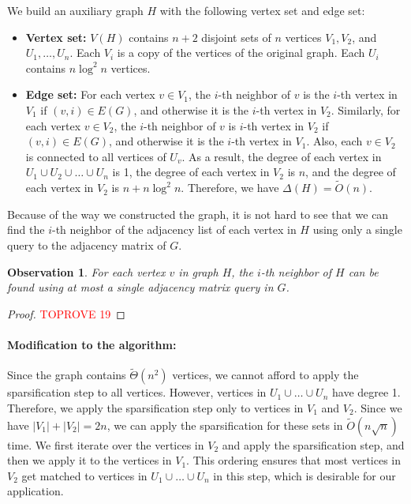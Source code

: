 \documentclass[letterpaper,11pt]{article}
\newcommand{\wt}[1]{\ensuremath{\widetilde{#1}}}
\newtheorem{observation}[lemma]{Observation}
\begin{document}
We build an auxiliary graph $H$ with the following vertex set and edge set:
\begin{itemize}
    \item \textbf{Vertex set:} $V(H)$ contains $n+2$ disjoint sets of $n$ vertices $V_1, V_2$, and $U_1, \ldots, U_n$. Each $V_i$ is a copy of the vertices of the original graph. Each $U_i$ contains $n \log^2 n$ vertices.
    \item \textbf{Edge set:} For each vertex $v \in V_1$, the $i$-th neighbor of $v$ is the $i$-th vertex in $V_1$ if $(v, i) \in E(G)$, and otherwise it is the $i$-th vertex in $V_2$. Similarly, for each vertex $v \in V_2$, the $i$-th neighbor of $v$ is $i$-th vertex in $V_2$ if $(v, i) \in E(G)$, and otherwise it is the $i$-th vertex in $V_1$. Also, each $v \in V_2$ is connected to all vertices of $U_v$. As a result, the degree of each vertex in $U_1 \cup U_2 \cup \ldots \cup U_n$ is 1, the degree of each vertex in $V_2$ is $n$, and the degree of each vertex in $V_2$ is $n + n\log^2 n$. Therefore, we have $\Delta(H) = \wt{O}(n)$.
\end{itemize}

Because of the way we constructed the graph, it is not hard to see that we can find the $i$-th neighbor of the adjacency list of each vertex in $H$ using only a single query to the adjacency matrix of $G$.


\begin{observation}
    For each vertex $v$ in graph $H$, the $i$-th neighbor of $H$ can be found using at most a single adjacency matrix query in $G$.
\end{observation}
\begin{proof}\textcolor{red}{TOPROVE 19}\end{proof}

\paragraph{Modification to the algorithm:} Since the graph contains $\wt{\Theta}(n^2)$ vertices, we cannot afford to apply the sparsification step to all vertices. However, vertices in $U_1 \cup \ldots \cup U_n$ have degree 1. Therefore, we apply the sparsification step only to vertices in $V_1$ and $V_2$. Since we have $|V_1| + |V_2| = 2n$, we can apply the sparsification for these sets in $\wt{O}(n\sqrt{n})$ time. We first iterate over the vertices in $V_2$ and apply the sparsification step, and then we apply it to the vertices in $V_1$. This ordering ensures that most vertices in $V_2$ get matched to vertices in $U_1 \cup \ldots \cup U_n$ in this step, which is desirable for our application.
\end{document}
